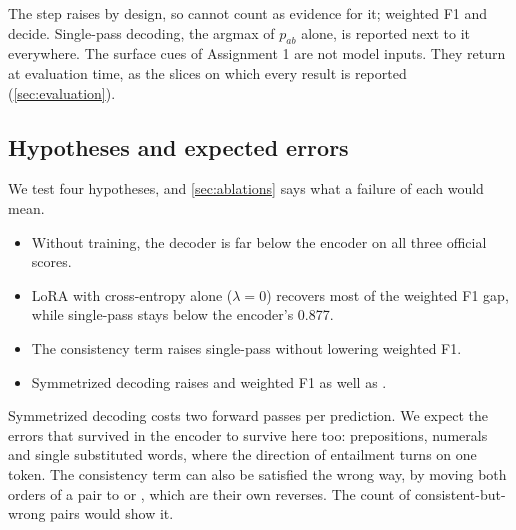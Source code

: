 The step raises \SoftCons{} by design, so \SoftCons{} cannot count as evidence for it; weighted F1 and \HardCons{} decide. Single-pass decoding, the argmax of $p_{ab}$ alone, is reported next to it everywhere. The surface cues of Assignment 1 are not model inputs. They return at evaluation time, as the slices on which every result is reported (\cref{sec:evaluation}).

\subsection{Hypotheses and expected errors}

We test four hypotheses, and \cref{sec:ablations} says what a failure of each would mean.
\begin{itemize}
\setlength{\itemsep}{1pt}
\setlength{\parskip}{0pt}
\item[H4] Without training, the decoder is far below the encoder on all three official scores.
\item[H5] LoRA with cross-entropy alone ($\lambda = 0$) recovers most of the weighted F1 gap, while single-pass \SoftCons{} stays below the encoder's 0.877.
\item[H6] The consistency term raises single-pass \SoftCons{} without lowering weighted F1.
\item[H7] Symmetrized decoding raises \HardCons{} and weighted F1 as well as \SoftCons{}.
\end{itemize}
Symmetrized decoding costs two forward passes per prediction. We expect the errors that survived in the encoder to survive here too: prepositions, numerals and single substituted words, where the direction of entailment turns on one token. The consistency term can also be satisfied the wrong way, by moving both orders of a pair to \EQ{} or \NO{}, which are their own reverses. The count of consistent-but-wrong pairs would show it.
